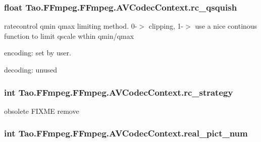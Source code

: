 \label{struct_tao_1_1_f_fmpeg_1_1_f_fmpeg_1_1_a_v_codec_context_a11e80e40d61d202378b6140df53598f8}
\hypertarget{struct_tao_1_1_f_fmpeg_1_1_f_fmpeg_1_1_a_v_codec_context_a45d343fab3d8facbd6faa48e4cc6c125}{
\subsubsection[{rc\_\-qsquish}]{\setlength{\rightskip}{0pt plus 5cm}float {\bf Tao.FFmpeg.FFmpeg.AVCodecContext.rc\_\-qsquish}}}
\label{struct_tao_1_1_f_fmpeg_1_1_f_fmpeg_1_1_a_v_codec_context_a45d343fab3d8facbd6faa48e4cc6c125}
ratecontrol qmin qmax limiting method. 0-\/$>$ clipping, 1-\/$>$ use a nice continous function to limit qscale wthin qmin/qmax
\begin{DoxyItemize}
\item encoding: set by user.
\item decoding: unused 
\end{DoxyItemize}\hypertarget{struct_tao_1_1_f_fmpeg_1_1_f_fmpeg_1_1_a_v_codec_context_a574648bb3775c785e52bff031f6dbce1}{
\subsubsection[{rc\_\-strategy}]{\setlength{\rightskip}{0pt plus 5cm}int {\bf Tao.FFmpeg.FFmpeg.AVCodecContext.rc\_\-strategy}}}
\label{struct_tao_1_1_f_fmpeg_1_1_f_fmpeg_1_1_a_v_codec_context_a574648bb3775c785e52bff031f6dbce1}
obsolete FIXME remove \hypertarget{struct_tao_1_1_f_fmpeg_1_1_f_fmpeg_1_1_a_v_codec_context_ae3097a5e183a3ae80b2406f537c85802}{
\subsubsection[{real\_\-pict\_\-num}]{\setlength{\rightskip}{0pt plus 5cm}int {\bf Tao.FFmpeg.FFmpeg.AVCodecContext.real\_\-pict\_\-num}}}
\label{struct_tao_1_1_f_fmpeg_1_1_f_fmpeg_1_1_a_v_codec_context_ae3097a5e183a3ae80b2406f537c85802}
